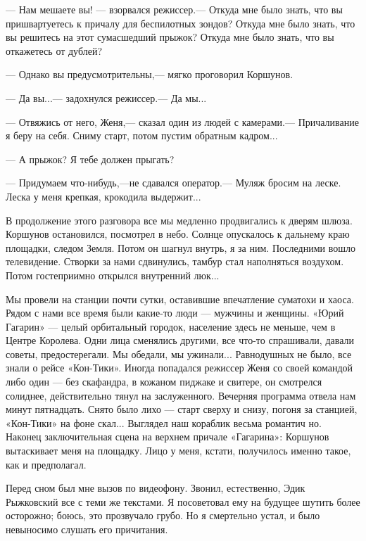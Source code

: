 \documentclass[11pt,a4paper,oneside]{article}
\begin{document}
— Нам мешаете вы! — взорвался режиссер.— Откуда мне было знать, что вы пришвартуетесь к причалу для беспилотных зондов? Откуда мне было знать, что вы решитесь на этот сумасшедший прыжок? Откуда мне было знать, что вы откажетесь от дублей?

— Однако вы предусмотрительны,— мягко проговорил Коршунов.

— Да вы...— задохнулся режиссер.— Да мы...

— Отвяжись от него, Женя,— сказал один из людей с камерами.— Причаливание я беру на себя. Сниму старт, потом пустим обратным кадром...

— А прыжок? Я тебе должен прыгать?

— Придумаем что-нибудь,—не сдавался оператор.— Муляж бросим на леске. Леска у меня крепкая, крокодила выдержит...

В продолжение этого разговора все мы медленно продвигались к дверям шлюза. Коршунов остановился, посмотрел в небо. Солнце опускалось к дальнему краю площадки, следом Земля. Потом он шагнул внутрь, я за ним. Последними вошло телевидение. Створки за нами сдвинулись, тамбур стал наполняться воздухом. Потом гостеприимно открылся внутренний люк...

Мы провели на станции почти сутки, оставившие впечатление суматохи и хаоса. Рядом с нами все время были какие-то люди — мужчины и женщины. «Юрий Гагарин» — целый орбитальный городок, население здесь не меньше, чем в Центре Королева. Одни лица сменялись другими, все что-то спрашивали, давали советы, предостерегали. Мы обедали, мы ужинали... Равнодушных не было, все знали о рейсе «Кон-Тики». Иногда попадался режиссер Женя со своей командой либо один — без скафандра, в кожаном пиджаке и свитере, он смотрелся солиднее, действительно тянул на заслуженного. Вечерняя программа отвела нам минут пятнадцать. Снято было лихо — старт сверху и снизу, погоня за станцией, «Кон-Тики» на фоне скал... Выглядел наш кораблик весьма романтич но. Наконец заключительная сцена на верхнем причале «Гагарина»: Коршунов вытаскивает меня на площадку. Лицо у меня, кстати, получилось именно такое, как и предполагал.

Перед сном был мне вызов по видеофону. Звонил, естественно, Эдик Рыжковский все с теми же текстами. Я посоветовал ему на будущее шутить более осторожно; боюсь, это прозвучало грубо. Но я смертельно устал, и было невыносимо слушать его причитания.
\end{document}
